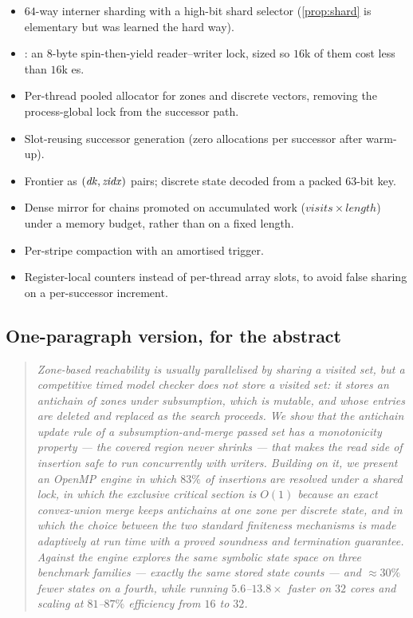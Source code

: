 \begin{itemize}[leftmargin=1.2em, itemsep=2pt]
\item $64$-way interner sharding with a high-bit shard selector
      (\cref{prop:shard} is elementary but was learned the hard way).
\item {}: an $8$-byte spin-then-yield reader--writer lock, sized so
      $16$k of them cost less than $16$k es.
\item Per-thread pooled allocator for zones and discrete vectors, removing the
      process-global  lock from the successor path.
\item Slot-reusing successor generation (zero allocations per successor after
      warm-up).
\item Frontier as $(\mathit{dk},\mathit{zidx})$ pairs; discrete state decoded from a
      packed $63$-bit key.
\item Dense mirror for chains promoted on accumulated work
      ($\mathit{visits} \times \mathit{length}$) under a memory budget, rather than on a
      fixed length.
\item Per-stripe compaction with an amortised trigger.
\item Register-local counters instead of per-thread array slots, to avoid false
      sharing on a per-successor increment.
\end{itemize}

\subsection{One-paragraph version, for the abstract}

\begin{quote}\itshape
Zone-based reachability is usually parallelised by sharing a visited set, but a
competitive timed model checker does not store a visited set: it stores an
antichain of zones under subsumption, which is mutable, and whose entries are
deleted and replaced as the search proceeds.  We show that the antichain update
rule of a subsumption-and-merge passed set has a monotonicity property --- the
covered region never shrinks --- that makes the read side of insertion safe to
run concurrently with writers.  Building on it, we present an OpenMP engine in
which $83\%$ of insertions are resolved under a shared lock, in which the
exclusive critical section is $O(1)$ because an exact convex-union merge keeps
antichains at one zone per discrete state, and in which the choice between the
two standard finiteness mechanisms is made adaptively at run time with a proved
soundness and termination guarantee.  Against \uppaal{} the engine explores the
same symbolic state space on three benchmark families --- exactly the same
stored state counts --- and $\approx 30\%$ fewer states on a fourth, while
running $5.6$--$13.8\times$ faster on $32$ cores and scaling at $81$--$87\%$
efficiency from $16$ to $32$.
\end{quote}
